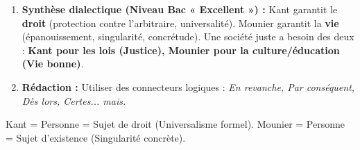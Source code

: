 \documentclass[11pt]{article}
\newcommand{\cle}[1]{{\popxbold\color{popdark}#1}}
\begin{document}
\begin{methode}
\begin{enumerate}
\begin{center}
    \end{center}
    \item \textbf{Synthèse dialectique (Niveau Bac « Excellent ») :} Kant garantit le \textbf{droit} (protection contre l'arbitraire, universalité). Mounier garantit la \textbf{vie} (épanouissement, singularité, concrétude). Une société juste a besoin des deux : \textbf{Kant pour les lois (Justice), Mounier pour la culture/éducation (Vie bonne)}.
    \item \textbf{Rédaction :} Utiliser des connecteurs logiques : \emph{En revanche, Par conséquent, Dès lors, Certes... mais.}
\end{enumerate}
\cle{Kant = Personne = Sujet de droit (Universalisme formel). Mounier = Personne = Sujet d'existence (Singularité concrète).}
\end{methode}
\end{document}
